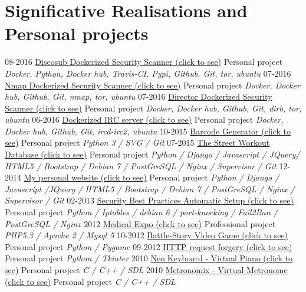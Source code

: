 \documentclass[]{friggeri-cv}
\begin{document}
\section{Significative Realisations and Personal projects}
\begin{entrylist}
  \entry
    {08-2016}
    {\href{https://hub.docker.com/r/4383/discosub}{Discosub Dockerized Security Scanner (click to see)}}
    {Personal project}
    {\emph{Docker, Python, Docker hub, Travis-CI, Pypi, Github, Git, tor, ubuntu}}
  \entry
    {07-2016}
    {\href{https://hub.docker.com/r/4383/system-service-footprint}{Nmap Dockerized Security Scanner (click to see)}}
    {Personal project}
    {\emph{Docker, Docker hub, Github, Git, nmap, tor, ubuntu}}
  \entry
    {07-2016}
    {\href{https://hub.docker.com/r/4383/director}{Director Dockerized Security Scanner (click to see)}}
    {Personal project}
    {\emph{Docker, Docker hub, Github, Git, dirb, tor, ubuntu}}
  \entry
    {06-2016}
    {\href{https://hub.docker.com/r/4383/irc-server}{Dockerized IRC server (click to see)}}
    {Personal project}
    {\emph{Docker, Docker hub, Github, Git, ircd-irc2, ubuntu}}
  \entry
    {10-2015}
    {\href{http://pypi.python.org/pypi/barcode-generator/0.1rc15}{Barcode Generator (click to see)}}
    {Personal project}
    {\emph{Python 3 / SVG / Git}}
  \entry
    {07-2015}
    {\href{http://www.the-street-workout-database.ovh}{The Street Workout Database (click to see)}}
    {Personal project}
    {\emph{Python / Django / Javascript / JQuery/ HTML5 / Bootstrap / Debian 7 / PostGreSQL / Nginx / Supervisor / Git}}
  \entry
    {12-2014}
    {\href{http:www.herve-beraud.ovh}{My personal website (click to see)}}
    {Personal project}
    {\emph{Python / Django / Javascript /JQuery / HTML5 / Bootstrap / Debian 7 / PostGreSQL / Nginx / Supervisor / Git}}
  \entry
    {02-2013}
    {\href{https://github.com/4383/fabric-debian/}{Security Best Practices Automatic Setup (click to see)}}
    {Personal project}
    {\emph{Python / Iptables /  debian 6 / port-knocking / Fail2Ban / PostGreSQL / Nginx}}
  \entry
    {2012}
    {\href{http://medical-expo.com}{Medical Expo (click to see)}}
    {Professional project}
    {\emph{PHP5.3 / Apache 2 / Mysql 5}}
  \entry
    {10-2012}
    {\href{http://github.com/4383/battle-story/}{Battle-Story Video Game (click to see)}}
    {Personal project}
    {\emph{Python / Pygame}}
  \entry
    {09-2012}
    {\href{http://github.com/4383/WebForge/}{HTTP request forgery (click to see)}}
    {Personal project}
    {\emph{Python / Tkinter}}
  \entry
    {2010}
    {\href{http://fr.wikipedia.org/wiki/Neo\_Keyboard}{Neo Keyboard - Virtual Piano (click to see)}}
    {Personal project}
    {\emph{C / C++ / SDL}}
  \entry
    {2010}
    {\href{http://fr.wikipedia.org/wiki/Metronomix}{Metronomix - Virtual Metronome (click to see)}}
    {Personal project}
    {\emph{C / C++ / SDL}}
\end{entrylist}
\end{document}
